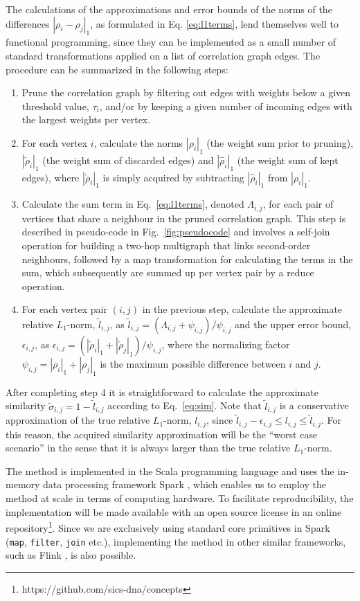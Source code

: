 \documentclass{sig-alternate}
\newcommand{\rn}[1]{\rho_{#1}}
\newcommand{\rns}[1]{|\rn{#1}|_1}
\newcommand{\mrn}[1]{\tau_{#1}}
\newcommand{\drns}[1]{|\check{\rho}_{#1}|_1}
\newcommand{\krns}[1]{|\hat{\rho}_{#1}|_1}
\newcommand{\asy}[1]{\tilde{\sigma}_{#1}}
\newcommand{\dnm}[2]{|\rn{#1}-\rn{#2}|_1}
\begin{document}
The calculations of the approximations and error bounds of the norms of the differences
$\dnm{i}{j}$, as formulated in Eq. \ref{eq:l1terms}, lend themselves well to functional
programming, since they can be implemented as a small number of standard transformations applied
on a list of correlation graph edges. The procedure can be summarized in the following
steps:
\begin{enumerate}
\item Prune the correlation graph by filtering out edges with weights below a given threshold value, $\mrn{i}$, and/or by keeping a given number of incoming edges with the largest weights per vertex.
\item For each vertex $i$, calculate the norms $\rns{i}$ (the weight sum prior
to pruning), $\drns{i}$ (the weight sum of discarded edges) and $\krns{i}$
(the weight sum of kept edges), where $\drns{i}$ is simply acquired by
subtracting $\krns{i}$ from $\rns{i}$.
\item Calculate the sum term in Eq.\ \ref{eq:l1terms}, denoted $\Lambda_{i,j}$,
for each pair of vertices that share a neighbour in the pruned correlation graph.
This step is described in pseudo-code in Fig.\ \ref{fig:pseudocode} and
involves a self-join operation for building a two-hop multigraph that links
second-order neighbours, followed by a map transformation for calculating the
terms in the sum, which subsequently are summed up per vertex pair by a reduce
operation.
\item For each vertex pair $(i,j)$ in the previous step, calculate the
approximate relative $L_1$-norm, $\tilde{l}_{i,j}$, as $\tilde{l}_{i,j} =
(\Lambda_{i,j} + \psi_{i,j})/\psi_{i,j}$ and the upper error bound,
$\epsilon_{i,j}$, as $\epsilon_{i,j} = (\drns{i} + \drns{j})/\psi_{i,j}$,
where the normalizing factor $\psi_{i,j} = \rns{i} + \rns{j}$ is
the maximum possible difference between $i$ and $j$.
\end{enumerate}
After completing step 4 it is straightforward to calculate the approximate
similarity $\asy{i,j} = 1 - \tilde{l}_{i,j}$ according to Eq.\ \ref{eq:sim}.
Note that $\tilde{l}_{i,j}$ is a conservative approximation of the true
relative $L_1$-norm, $l_{i,j}$, since $\tilde{l}_{i,j} - \epsilon_{i,j} \leq
l_{i,j} \leq \tilde{l}_{i,j}$. For this reason, the acquired similarity
approximation will be the ``worst case scenario'' in the sense that it is always larger than the true relative $L_1$-norm.

The method is implemented in the Scala programming language and uses the in-memory
data processing framework Spark \cite{Zaharia-2012}, which enables us
to employ the method at scale in terms of computing hardware.
To facilitate reproducibility, the implementation will be made available
with an open source license in an online repository\footnote{https://github.com/sics-dna/concepts}.
Since we are exclusively using standard core primitives in Spark (\texttt{map},
\texttt{filter}, \texttt{join} etc.), implementing the
method in other similar frameworks, such as Flink \cite{Alexandrov14}, is also
possible.
\end{document}
